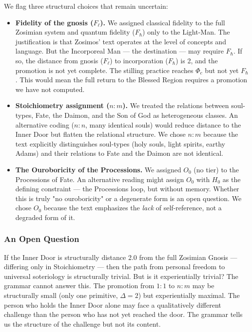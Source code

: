 \documentclass[12pt,a4paper]{article}
\begin{document}
We flag three structural choices that remain uncertain:

\begin{itemize}
    \item \textbf{Fidelity of the gnosis ($F_{\ell}$).} We assigned classical fidelity to the full Zosimian system and quantum fidelity ($F_{\hbar}$) only to the Light-Man. The justification is that Zosimos' text operates at the level of concepts and language. But the Incorporeal Man --- the destination --- may require $F_{\hbar}$. If so, the distance from gnosis ($F_{\ell}$) to incorporation ($F_{\hbar}$) is 2, and the promotion is not yet complete. The stilling practice reaches $\Phi_c$ but not yet $F_{\hbar}$. This would mean the full return to the Blessed Region requires a promotion we have not computed.
    \item \textbf{Stoichiometry assignment ($n:m$).} We treated the relations between soul-types, Fate, the Daimon, and the Son of God as heterogeneous classes. An alternative coding ($n:n$, many identical souls) would reduce distance to the Inner Door but flatten the relational structure. We chose $n:m$ because the text explicitly distinguishes soul-types (holy souls, light spirits, earthy Adams) and their relations to Fate and the Daimon are not identical.
    \item \textbf{The Ouroboricity of the Processions.} We assigned $O_0$ (no tier) to the Processions of Fate. An alternative reading might assign $O_0$ with $H_0$ as the defining constraint --- the Processions loop, but without memory. Whether this is truly "no ouroboricity" or a degenerate form is an open question. We chose $O_0$ because the text emphasizes the \emph{lack} of self-reference, not a degraded form of it.
\end{itemize}

\subsubsection{An Open Question}

If the Inner Door is structurally distance 2.0 from the full Zosimian Gnosis --- differing only in Stoichiometry --- then the path from personal freedom to universal soteriology is structurally trivial. But is it experientially trivial? The grammar cannot answer this. The promotion from $1:1$ to $n:m$ may be structurally small (only one primitive, $\Delta = 2$) but experientially maximal. The person who holds the Inner Door alone may face a qualitatively different challenge than the person who has not yet reached the door. The grammar tells us the structure of the challenge but not its content.
\end{document}
